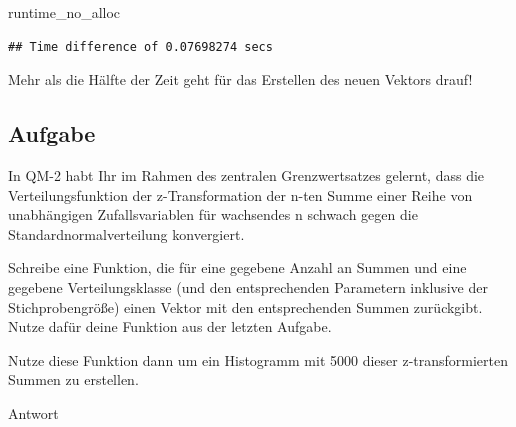 \documentclass[
]{book}
\newenvironment{Shaded}{\begin{snugshade}}{\end{snugshade}}
\newcommand{\NormalTok}[1]{#1}
\begin{document}
\begin{Shaded}
\begin{Highlighting}[]
\NormalTok{runtime\_no\_alloc}
\end{Highlighting}
\end{Shaded}

\begin{verbatim}
## Time difference of 0.07698274 secs
\end{verbatim}

Mehr als die Hälfte der Zeit geht für das Erstellen des neuen Vektors drauf!

\hypertarget{aufgabe-4}{%
\subsection{Aufgabe}\label{aufgabe-4}}

In QM-2 habt Ihr im Rahmen des zentralen Grenzwertsatzes gelernt, dass die Verteilungsfunktion der z-Transformation der n-ten Summe einer Reihe von unabhängigen Zufallsvariablen für wachsendes n schwach gegen die Standardnormalverteilung konvergiert.

Schreibe eine Funktion, die für eine gegebene Anzahl an Summen und eine gegebene Verteilungsklasse (und den entsprechenden Parametern inklusive der Stichprobengröße) einen Vektor mit den entsprechenden Summen zurückgibt.
Nutze dafür deine Funktion aus der letzten Aufgabe.

Nutze diese Funktion dann um ein Histogramm mit 5000 dieser z-transformierten Summen zu erstellen.

Antwort
\end{document}
